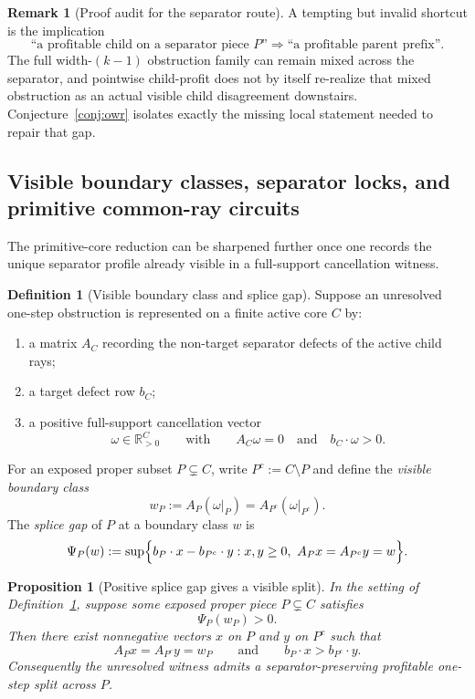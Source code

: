 \documentclass[11pt]{article}
\newtheorem{proposition}[theorem]{Proposition}
\theoremstyle{definition}
\newtheorem{definition}[theorem]{Definition}
\newtheorem{remark}[theorem]{Remark}
\newcommand{\R}{\mathbb{R}}
\newcommand{\1}{\mathbf{1}}
\begin{document}
\begin{remark}[Proof audit for the separator route]\label{rem:separator-route-audit}
A tempting but invalid shortcut is the implication
\[
\text{``a profitable child on a separator piece }P\text{''}
\Longrightarrow
\text{``a profitable parent prefix''}.
\]
The full width-$(k-1)$ obstruction family can remain mixed across the separator, and pointwise child-profit does not by itself re-realize that mixed obstruction as an actual visible child disagreement downstairs.
Conjecture~\ref{conj:owr} isolates exactly the missing local statement needed to repair that gap.
\end{remark}





\subsection*{Visible boundary classes, separator locks, and primitive common-ray circuits}
The primitive-core reduction can be sharpened further once one records the unique separator profile already visible in a full-support cancellation witness.

\begin{definition}[Visible boundary class and splice gap]\label{def:visible-boundary-splice}
Suppose an unresolved one-step obstruction is represented on a finite active core $C$ by:
\begin{enumerate}[label=(\roman*),leftmargin=2.2em]
\item a matrix $A_C$ recording the non-target separator defects of the active child rays;
\item a target defect row $b_C$;
\item a positive full-support cancellation vector
\[
\omega\in \R_{>0}^{C}
\qquad\text{with}\qquad
A_C\omega=0
\quad\text{and}\quad
b_C\cdot \omega>0.
\]
\end{enumerate}
For an exposed proper subset $P\subsetneq C$, write $P^c:=C\setminus P$ and define the \emph{visible boundary class}
\[
w_P:=A_P(\omega|_P)=A_{P^c}(\omega|_{P^c}).
\]
The \emph{splice gap} of $P$ at a boundary class $w$ is
\[
\Psi_P(w):=
\sup\Bigl\{
b_P\cdot x-b_{P^c}\cdot y:
x,y\ge 0,\ A_Px=A_{P^c}y=w
\Bigr\}.
\]
\end{definition}

\begin{proposition}[Positive splice gap gives a visible split]\label{prop:positive-splice-visible-split}
In the setting of Definition~\ref{def:visible-boundary-splice}, suppose some exposed proper piece $P\subsetneq C$ satisfies
\[
\Psi_P(w_P)>0.
\]
Then there exist nonnegative vectors $x$ on $P$ and $y$ on $P^c$ such that
\[
A_Px=A_{P^c}y=w_P
\qquad\text{and}\qquad
b_P\cdot x>b_{P^c}\cdot y.
\]
Consequently the unresolved witness admits a separator-preserving profitable one-step split across $P$.
\end{proposition}
\end{document}
